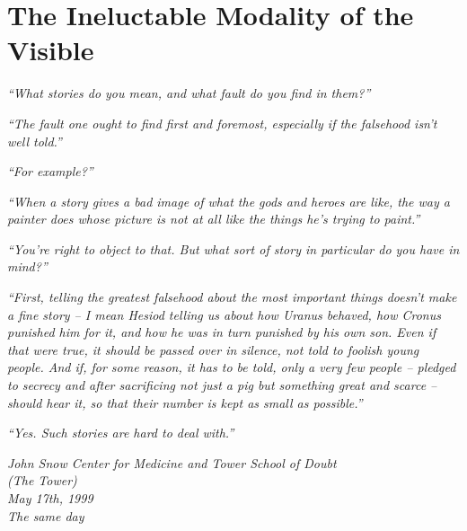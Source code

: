 \hypertarget{the-ineluctable-modality-of-the-visible}{%
\chapter{The Ineluctable Modality of the
Visible}\label{the-ineluctable-modality-of-the-visible}}

\emph{``What stories do you mean, and what fault do you find in them?''}

\emph{``The fault one ought to find first and foremost, especially if
the falsehood isn't well told.''}

\emph{``For example?''}

\emph{``When a story gives a bad image of what the gods and heroes are
like, the way a painter does whose picture is not at all like the things
he's trying to paint.''}

\emph{``You're right to object to that. But what sort of story in
particular do you have in mind?''}

\emph{``First, telling the greatest falsehood about the most important
things doesn't make a fine story -- I mean Hesiod telling us about how
Uranus behaved, how Cronus punished him for it, and how he was in turn
punished by his own son. Even if that were true, it should be passed
over in silence, not told to foolish young people. And if, for some
reason, it has to be told, only a very few people -- pledged to secrecy
and after sacrificing not just a pig but something great and scarce --
should hear it, so that their number is kept as small as possible.''}

\emph{``Yes. Such stories are hard to deal with.''}


\mybreak

\pagebreak


\emph{John Snow Center for Medicine and Tower School of Doubt\\
(The Tower)}\\
\emph{May 17th, 1999}\\
\emph{The same day}\\

